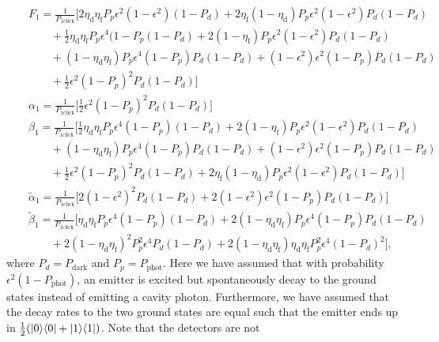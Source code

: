 \begin{eqnarray}
&&F_{1}=\frac{1}{P_{\text{1click}}}
\Big[2\eta_{\text{d}}\eta_{\text{f}}P_p
\epsilon^{2}(1-\epsilon^{2})(1-P_d)
+2\eta_{\text{f}}(1-\eta_{\text{d}})P_p
\epsilon^{2}(1-\epsilon^{2})P_d(1-P_d)\nonumber
\\
&&\qquad+\frac{1}{2}\eta_{\text{d}}\eta_{\text{f}}P_p
\epsilon^{4}(1-P_p(1-P_d)+2(1-\eta_{\text{f}})P_p\epsilon^{2}(1-
\epsilon^{2})P_d(1-P_d) \nonumber \\
&&\qquad+(1-\eta_{\text{d}}\eta_{\text{f}})P_p
\epsilon^{4}(1-P_p)P_d(1-P_d)+(1-\epsilon^{2})\epsilon^{2}(1-P_p)
P_d(1-P_d)\nonumber
\\
&&\qquad+\frac{1}{2}\epsilon^{2}(1-P_p)^{2}
P_d(1-P_d)\Big] 
\\
&&\alpha_{1}=\frac{1}{P_{\text{1click}}}\Big[\frac{1}{2}
\epsilon^{2}(1-P_p)^{2}P_d (1-P_d)\Big]
\\
&&\beta_{1}=\frac{1}{P_{\text{1click}}}\Big[\frac{1}{2}\eta_{\text{d}}
\eta_{\text{f}}P_p\epsilon^{4}(1-P_p)
(1-P_d) +2(1-\eta_{\text{f}})P_p\epsilon^{2}
(1-\epsilon^{2})P_d(1-P_d) \nonumber \\
&&\qquad+(1-\eta_{\text{d}}\eta_{\text{f}})P_p
\epsilon^{4}(1-P_p)P_d(1-P_d)
+(1-\epsilon^{2})\epsilon^{2}(1-P_p)
P_d(1-P_d) \nonumber \\
&&\qquad+\frac{1}{2}\epsilon^{2}(1-P_p)^{2}
P_d(1-P_d) 
+2\eta_{\text{f}}(1-\eta_{\text{d}})P_p
\epsilon^{2}(1-\epsilon^{2})P_d(1-P_d)\Big] 
\\
&&\tilde{\alpha}_{1}=\frac{1}{P_{\text{1click}}}
\Big[2(1-\epsilon^{2})^{2}P_d(1-P_d)
+2(1-\epsilon^{2})\epsilon^{2}(1-P_p)
P_d(1-P_d)\Big] 
\\
&&\tilde{\beta}_{1}=\frac{1}{P_{\text{1click}}}
\Big[\eta_{\text{d}}\eta_{\text{f}}P_p
\epsilon^{4}(1-P_p)(1-P_d)
+2(1-\eta_{\text{d}}\eta_{\text{f}})P_p
\epsilon^{4}(1-P_p)P_d(1-P_d) \nonumber \\
&&\qquad +2(1-\eta_{\text{d}}\eta_{\text{f}})^{2}
P_p^{2}\epsilon^{4}P_d(1-P_d)
+2(1-\eta_{\text{d}}\eta_{\text{f}})
\eta_{\text{d}}\eta_{\text{f}}P_p^{2}
\epsilon^{4}(1-P_d)^{2}\Big],
\end{eqnarray}
where $P_d = P_{\text{dark}}$ and $P_p = P_{\text{phot}}$.
Here we have assumed that with probability $\epsilon^{2}(1-P_{\text{phot}})$, an
emitter is excited but spontaneously decay to the ground states instead of
emitting a cavity photon. Furthermore, we have assumed that the decay rates to
the two ground states are equal such that the emitter ends up in
$\frac{1}{2}(| 0 \rangle\langle 0 |+| 1 \rangle\langle 1 |)$. Note that the detectors are not
